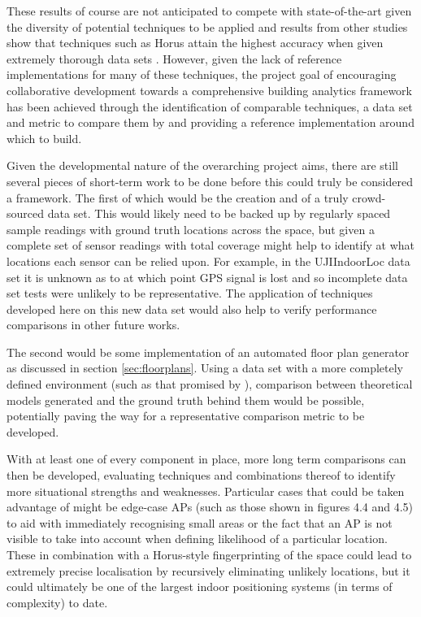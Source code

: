 \documentclass{UoYCSproject}
\begin{document}
        These results of course are not anticipated to compete with state-of-the-art given the diversity of potential techniques to be applied and results from other studies show that techniques such as Horus attain the highest accuracy when given extremely thorough data sets \cite{youssef2005horus}. However, given the lack of reference implementations for many of these techniques, the project goal of encouraging collaborative development towards a comprehensive building analytics framework has been achieved through the identification of comparable techniques, a data set and metric to compare them by and providing a reference implementation around which to build.
        
        Given the developmental nature of the overarching project aims, there are still several pieces of short-term work to be done before this could truly be considered a framework. The first of which would be the creation and of a truly crowd-sourced data set. This would likely need to be backed up by regularly spaced sample readings with ground truth locations across the space, but given a complete set of sensor readings with total coverage might help to identify at what locations each sensor can be relied upon. For example, in the UJIIndoorLoc data set it is unknown as to at which point GPS signal is lost and so incomplete data set tests were unlikely to be representative. The application of techniques developed here on this new data set would also help to verify performance comparisons in other future works.
            
        The second would be some implementation of an automated floor plan generator as discussed in section \ref{sec:floorplans}. Using a data set with a more completely defined environment (such as that promised by \citet{JoaquinEmail}), comparison between theoretical models generated and the ground truth behind them would be possible, potentially paving the way for a representative comparison metric to be developed.
            
        With at least one of every component in place, more long term comparisons can then be developed, evaluating techniques and combinations thereof to identify more situational strengths and weaknesses. Particular cases that could be taken advantage of might be edge-case APs (such as those shown in figures 4.4 and 4.5) to aid with immediately recognising small areas or the fact that an AP is not visible to take into account when defining likelihood of a particular location. These in combination with a Horus-style fingerprinting of the space could lead to extremely precise localisation by recursively eliminating unlikely locations, but it could ultimately be one of the largest indoor positioning systems (in terms of complexity) to date.
\end{document}
